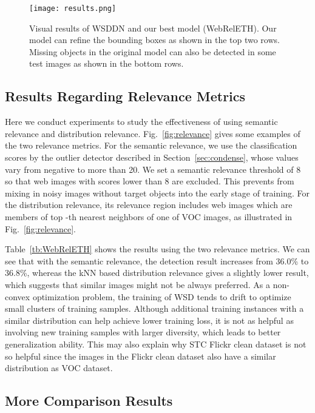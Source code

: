 \documentclass[10pt,twocolumn,letterpaper]{article}
\begin{document}
\begin{figure*}[h!]
\centering
\texttt{[image: results.png]}
\caption{Visual results of WSDDN and our best model (WebRelETH). Our model can refine the bounding boxes as shown in the top two rows. Missing objects in the original model can also be detected in some test images as shown in the bottom rows. }
\label{fig:results}
\end{figure*}

\subsection {Results Regarding Relevance Metrics}
Here we conduct experiments to study the effectiveness of using semantic relevance and distribution relevance. Fig.~\ref{fig:relevance} gives some examples of the two relevance metrics. For the semantic relevance, we use the classification scores by the outlier detector described in Section~\ref{sec:condense}, whose values vary from negative to more than 20. We set a semantic relevance threshold of 8 so that web images with scores lower than 8 are excluded. This prevents from mixing in noisy images without target objects into the early stage of training. For the distribution relevance, its relevance region includes web images which are members of top -th nearest neighbors of one of VOC images, as illustrated in Fig.~\ref{fig:relevance}.


Table~\ref{tb:WebRelETH} shows the results using the two relevance metrics. We can see that with the semantic relevance, the detection result increases from 36.0\% to 36.8\%, whereas the kNN based distribution relevance gives a slightly lower result, which suggests that similar images might not be always preferred. As a non-convex optimization problem, the training of WSD tends to drift to optimize small clusters of training samples. Although additional training instances with a similar distribution can help achieve lower training loss, it is not as helpful as involving new training samples with larger diversity, which leads to better generalization ability. This may also explain why STC Flickr clean dataset is not so helpful since the images in the Flickr clean dataset also have a similar distribution as VOC dataset. 



\subsection {More Comparison Results}
\end{document}
